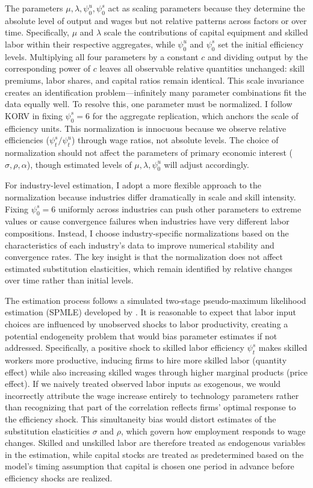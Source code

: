 \documentclass[12pt]{article}
\begin{document}
The parameters $\mu, \lambda, \psi^u_0, \psi^s_0$ act as scaling parameters because they determine the absolute level of output and wages but not relative patterns across factors or over time. Specifically, $\mu$ and $\lambda$ scale the contributions of capital equipment and skilled labor within their respective aggregates, while $\psi^u_0$ and $\psi^s_0$ set the initial efficiency levels. Multiplying all four parameters by a constant $c$ and dividing output by the corresponding power of $c$ leaves all observable relative quantities unchanged: skill premiums, labor shares, and capital ratios remain identical. This scale invariance creates an identification problem---infinitely many parameter combinations fit the data equally well. To resolve this, one parameter must be normalized. I follow KORV in fixing $\psi^s_0 = 6$ for the aggregate replication, which anchors the scale of efficiency units. This normalization is innocuous because we observe relative efficiencies ($\psi^s_t / \psi^u_t$) through wage ratios, not absolute levels. The choice of normalization should not affect the parameters of primary economic interest ($\sigma, \rho, \alpha$), though estimated levels of $\mu, \lambda, \psi^u_0$ will adjust accordingly.

For industry-level estimation, I adopt a more flexible approach to the normalization because industries differ dramatically in scale and skill intensity. Fixing $\psi^s_0 = 6$ uniformly across industries can push other parameters to extreme values or cause convergence failures when industries have very different labor compositions. Instead, I choose industry-specific normalizations based on the characteristics of each industry's data to improve numerical stability and convergence rates. The key insight is that the normalization does not affect estimated substitution elasticities, which remain identified by relative changes over time rather than initial levels.

The estimation process follows a simulated two-stage pseudo-maximum likelihood estimation (SPMLE) developed by \citet{white1996estimation}. It is reasonable to expect that labor input choices are influenced by unobserved shocks to labor productivity, creating a potential endogeneity problem that would bias parameter estimates if not addressed. Specifically, a positive shock to skilled labor efficiency $\psi^s_t$ makes skilled workers more productive, inducing firms to hire more skilled labor (quantity effect) while also increasing skilled wages through higher marginal products (price effect). If we naively treated observed labor inputs as exogenous, we would incorrectly attribute the wage increase entirely to technology parameters rather than recognizing that part of the correlation reflects firms' optimal response to the efficiency shock. This simultaneity bias would distort estimates of the substitution elasticities $\sigma$ and $\rho$, which govern how employment responds to wage changes. Skilled and unskilled labor are therefore treated as endogenous variables in the estimation, while capital stocks are treated as predetermined based on the model's timing assumption that capital is chosen one period in advance before efficiency shocks are realized.
\end{document}

